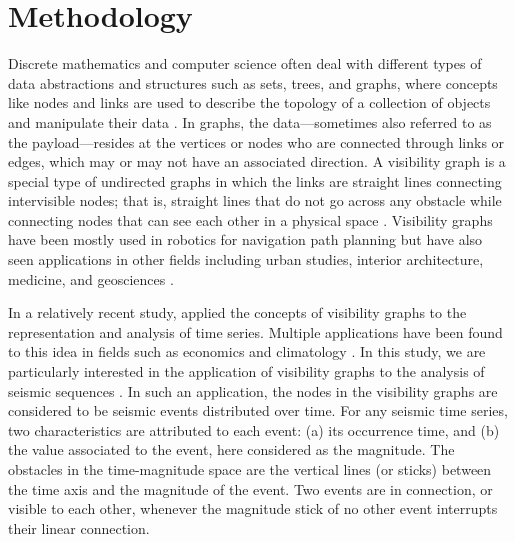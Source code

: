 
\section{Methodology}
\label{sec:methodology}

Discrete mathematics and computer science often deal with different types of data abstractions and structures such as sets, trees, and graphs, where concepts like nodes and links are used to describe the topology of a collection of objects and manipulate their data \citep[e.g.,][]{Skiena_2008_Book}. In graphs, the data---sometimes also referred to as the payload---resides at the vertices or nodes who are connected through links or edges, which may or may not have an associated direction. A visibility graph is a special type of undirected graphs in which the links are straight lines connecting intervisible nodes; that is, straight lines that do not go across any obstacle while connecting nodes that can see each other in a physical space \citep{LozanoPerez_1979_CACM}. Visibility graphs have been mostly used in robotics for navigation path planning \citep[e.g.,][]{Huang_2004_Proc, Oommen_1987_JRA} but have also seen applications in other fields including urban studies, interior architecture, medicine, and geosciences \citep[e.g.,][]{Raman_2010_UE, Ahmadlou_2010_JNT, Varoudis_2014_JSS, Phillips_2015_ESR}.

In a relatively recent study, \citet{Lacasa2008} applied the concepts of visibility graphs to the representation and analysis of time series. Multiple applications have been found to this idea in fields such as economics \citep{Yang_2009_PA, Wang2012} and climatology \citep{Elsner_2009_GRL}. In this study, we are particularly interested in the application of visibility graphs to the analysis of seismic sequences \citep{Telesca2012}. In such an application, the nodes in the visibility graphs are considered to be seismic events distributed over time. For any seismic time series, two characteristics are attributed to each event: (a) its occurrence time, and (b) the value associated to the event, here considered as the magnitude. The obstacles in the time-magnitude space are the vertical lines (or sticks) between the time axis and the magnitude of the event. Two events are in connection, or visible to each other, whenever the magnitude stick of no other event interrupts their linear connection.

